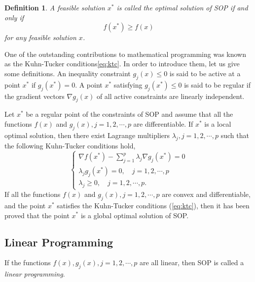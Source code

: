 \newtheorem{mpdefop}[mpdef]{Definition}
\begin{mpdefop}
A feasible solution $x^*$ is called the optimal
solution of SOP if and only if
\begin{equation}
f(x^*)\ge f(x)
\end{equation}
for any feasible solution $x$.
\end{mpdefop}

One of the outstanding contributions to mathematical programming was known as
the Kuhn-Tucker conditions\ref{eq:ktc}. In order to introduce them, let us give
some definitions. An inequality constraint $g_j(x)\le 0$ is said to be active at
a point $x^*$ if $g_j(x^*)=0$. A point $x^*$ satisfying $g_j(x^*)\le 0$ is said
to be regular if the gradient vectors $\nabla g_j(x)$ of all active constraints
are linearly independent.

Let $x^*$ be a regular point of the constraints of SOP and assume that all the
functions $f(x)$ and $g_j(x),j=1,2,\cdots,p$ are differentiable. If $x^*$ is a
local optimal solution, then there exist Lagrange multipliers
$\lambda_j,j=1,2,\cdots,p$ such that the following Kuhn-Tucker conditions hold,
\begin{equation}
\label{eq:ktc}
\left\{\begin{array}{l}
    \nabla f(x^*)-\sum\limits_{j=1}^p\lambda_j\nabla g_j(x^*)=0\\[0.3cm]
    \lambda_jg_j(x^*)=0,\quad j=1,2,\cdots,p\\[0.2cm]
    \lambda_j\ge 0,\quad j=1,2,\cdots,p.
\end{array}\right.
\end{equation}
If all the functions $f(x)$ and $g_j(x),j=1,2,\cdots,p$ are convex and
differentiable, and the point $x^*$ satisfies the Kuhn-Tucker conditions
(\ref{eq:ktc}), then it has been proved that the point $x^*$ is a global optimal
solution of SOP.

\subsection{Linear Programming} 
\label{sec:lp}

If the functions $f(x),g_j(x),j=1,2,\cdots,p$ are all linear, then SOP is called
a {\em linear programming}.


